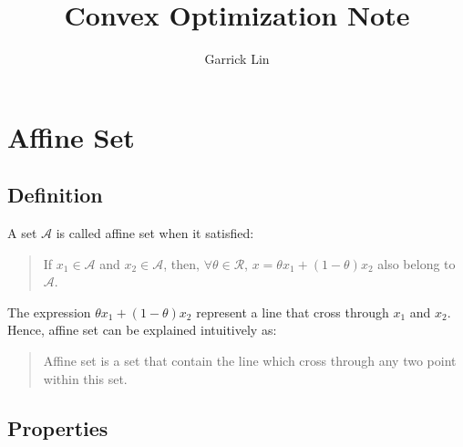 \documentclass[10pt,a4paper]{article}
\author{Garrick Lin}
\title{Convex Optimization Note}
\begin{document}
\maketitle

\section{Affine Set}

\subsection{Definition}
A set $\mathcal{A}$ is called affine set when it satisfied:
\begin{quotation}
	If $x_{1} \in \mathcal{A}$ and $x_{2} \in \mathcal{A}$, then, $\forall \theta \in \mathcal{R}$, $x = \theta x_{1} + (1 - \theta)x_{2}$ also belong to $\mathcal{A}$. 
\end{quotation}
The expression $\theta x_{1} + (1 - \theta) x_{2}$ represent a line that cross through $x_{1}$ and $x_{2}$. Hence, affine set can be explained intuitively as:
\begin{quote}
	Affine set is a set that contain the line which cross through any two point within this set.
\end{quote} 

\subsection{Properties}
\end{document}
